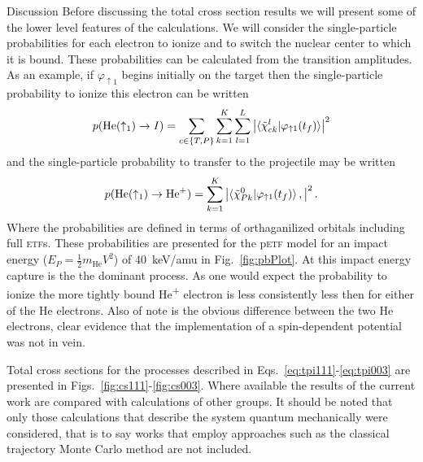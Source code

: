 \documentclass[aps, pra, reprint, groupedaddress, amsfonts, longbibliography,
               amsmath, amssymb, showpacs, nofootinbib]{revtex4-1}
\begin{document}
\begin{section}{Discussion \label{sec:disc}}
   Before discussing the total cross section results we will present some of the lower level features of
   the calculations. We will consider the single-particle probabilities for each electron to ionize and
   to switch the nuclear center to which it is bound. These probabilities can be calculated from the
   transition amplitudes. As an example, if $\varphi_{\uparrow 1}$ begins initially on the target then
   the single-particle probability to ionize this electron can be written
   \begin{equation} \label{eq:ionprob}
      p(\mathrm{He}(\uparrow_1) \rightarrow I ) =
         \sum\limits_{c \in \{T,P\}} \sum\limits_{k=1}^K \sum\limits_{l = 1}^L
         \left| \braket{ \tilde{\chi}^{l}_{c k} | \varphi_{\uparrow 1}(t_f)} \right|^2
   \end{equation}
   and the single-particle probability to transfer to the projectile may be written
   \begin{equation} \label{eq:transprob}
      p(\mathrm{He}(\uparrow_1) \rightarrow \mathrm{He}^+) =
         \sum\limits_{k=1}^K \left| \braket{ \tilde{\chi}^{0}_{P k} | \varphi_{\uparrow 1}(t_f)},
                             \right|^2.
   \end{equation}
   Where the probabilities are defined in terms of orthaganilized orbitals including full \textsc{etf}s.
   These probabilities are presented for the p\textsc{etf} model for an impact energy ($E_P =
   \frac{1}{2} m_\textrm{He} V^2$) of 40~keV/amu in Fig.~\ref{fig:pbPlot}. At this impact energy
   capture is the the dominant process. As one would expect the probability to ionize the more tightly
   bound He\textsuperscript{+} electron is less consistently less then for either of the He electrons.
   Also of note is the obvious difference between the two He electrons, clear evidence that the
   implementation of a spin-dependent potential was not in vein.

   Total cross sections for the processes described in
   Eqs.~\eqref{eq:tpi111}-\eqref{eq:tpi003} are presented in Figs.~\ref{fig:cs111}-\ref{fig:cs003}.
   Where available the results of the current work are compared with calculations of other groups. It
   should be noted that only those calculations that describe the system quantum mechanically were
   considered, that is to say works that employ approaches such as the classical trajectory Monte Carlo
   method are not included.


\end{section}
\end{document}
